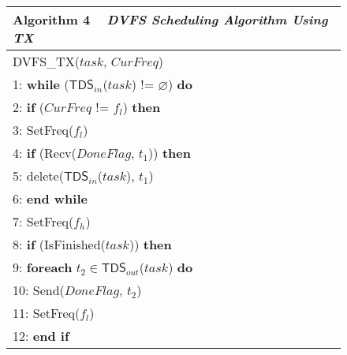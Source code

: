 \documentclass[12pt]{elsarticle}
\begin{document}
\begin{figure}\centering
\begin{tabular}{@{}p{\columnwidth}@{}}
\toprule
\textbf{Algorithm 4} ~ \textit{DVFS Scheduling Algorithm Using TX}
\\\midrule
\textsf{DVFS\_TX}\textsf{(}$task$, $CurFreq$\textsf{)}\\
\hspace{2.09mm}1: \textbf{while} ($\mathsf{TDS}_{in}$\textsf{($task$)} != $\varnothing$) \textbf{do}\\
\hspace{2.09mm}2: \quad \textbf{if} ($CurFreq$ != $f_l$) \textbf{then}\\
\hspace{2.09mm}3: \quad\quad \textsf{SetFreq($f_l$)}\\
\hspace{2.09mm}4: \quad \textbf{if} (\textsf{Recv($DoneFlag$, $t_1$)}) \textbf{then}\\
\hspace{2.09mm}5: \quad\quad \textsf{delete($\mathsf{TDS}_{in}$($task$), $t_1$)}\\
\hspace{2.09mm}6: \textbf{end while}\\
\hspace{2.09mm}7: \textsf{SetFreq($f_h$)}\\
\hspace{2.09mm}8: \textbf{if} (\textsf{IsFinished($task$)}) \textbf{then}\\
\hspace{2.09mm}9: \quad \textbf{foreach} $t_2 \in \mathsf{TDS}_{out}$\textsf{($task$)} \textbf{do}\\
10: \quad\quad \textsf{Send($DoneFlag$, $t_2$)}\\
11: \quad \textsf{SetFreq($f_l$)}\\
12: \textbf{end if}\\
\midrule
\end{tabular}
\end{figure}
\end{document}
